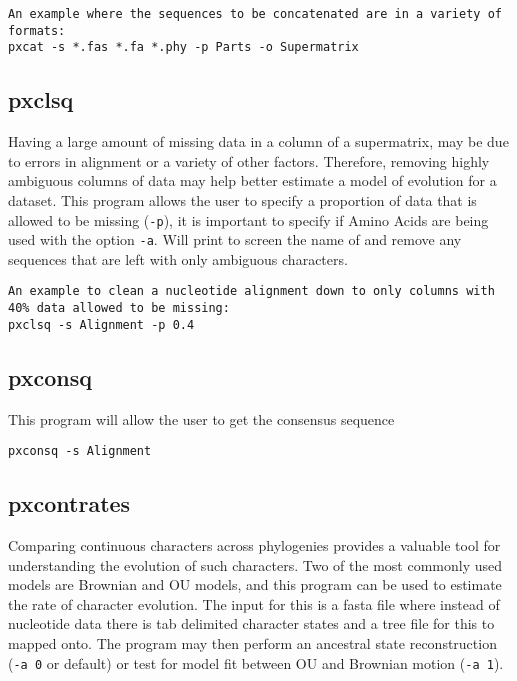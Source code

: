 \documentclass[12pt,letterpaper]{memoir}
\begin{document}
\begin{flushleft}
\begin{verbatim}
An example where the sequences to be concatenated are in a variety of formats:
pxcat -s *.fas *.fa *.phy -p Parts -o Supermatrix
\end{verbatim}
\end{flushleft}

\subsection{pxclsq}

Having a large amount of missing data in a column of a supermatrix, may be due to errors in alignment or a variety of other factors. Therefore, removing highly ambiguous columns of data may help better estimate a model of evolution for a dataset. This program allows the user to specify a proportion of data that is allowed to be missing (\texttt{-p}), it is important to specify if Amino Acids are being used with the option \texttt{-a}. Will print to screen the name of and remove any sequences that are left with only ambiguous characters.

\begin{flushleft}
\begin{verbatim}
An example to clean a nucleotide alignment down to only columns with 40% data allowed to be missing:
pxclsq -s Alignment -p 0.4
\end{verbatim}
\end{flushleft}

\subsection{pxconsq}

This program will allow the user to get the consensus sequence 

\begin{flushleft}
\begin{verbatim}
pxconsq -s Alignment
\end{verbatim}
\end{flushleft}

\subsection{pxcontrates}

Comparing continuous characters across phylogenies provides a valuable tool for understanding the evolution of such characters. Two of the most commonly used models are Brownian and OU models, and this program can be used to estimate the rate of character evolution. The input for this is a fasta file where instead of nucleotide data there is tab delimited character states and a tree file for this to mapped onto. The program may then perform an ancestral state reconstruction (\texttt{-a 0} or default) or test for model fit between OU and Brownian motion (\texttt{-a 1}).
\end{document}
